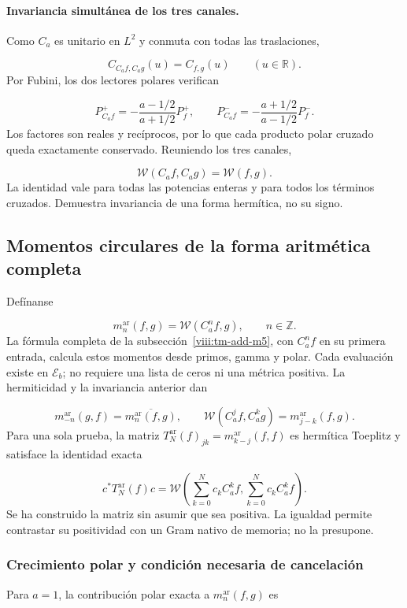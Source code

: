 \paragraph{Invariancia simultánea de los tres canales.}
\label{viii:tm-add:invariancia-weil} Como \(C_a\) es unitario en \(L^2\) y conmuta con todas las traslaciones,

\[
C_{C_af,C_ag}(u)=C_{f,g}(u)\qquad(u\in\mathbb R).
\]
Por Fubini, los dos lectores polares verifican

\[
P_{C_af}^+=-\frac{a-1/2}{a+1/2}P_f^+,
\qquad
P_{C_af}^-=-\frac{a+1/2}{a-1/2}P_f^-.
\]
Los factores son reales y recíprocos, por lo que cada producto polar cruzado queda exactamente conservado. Reuniendo los tres canales,

\[
\boxed{\mathscr W(C_af,C_ag)=\mathscr W(f,g).}
\]
La identidad vale para todas las potencias enteras y para todos los términos cruzados. Demuestra invariancia de una forma hermítica, no su signo.


\subsection{Momentos circulares de la forma aritmética completa}
\label{viii:tm-add-m6}
Defínanse

\[
m_n^{\mathrm{ar}}(f,g)=\mathscr W(C_a^n f,g),\qquad n\in\mathbb Z.
\]
La fórmula completa de la subsección~\ref{viii:tm-add-m5}, con \(C_a^nf\) en su primera entrada, calcula estos momentos desde primos, gamma y polar. Cada evaluación existe en \(\mathscr E_b\); no requiere una lista de ceros ni una métrica positiva. La hermiticidad y la invariancia anterior dan

\[
m_{-n}^{\mathrm{ar}}(g,f)=\overline{m_n^{\mathrm{ar}}(f,g)},\qquad
\mathscr W(C_a^j f,C_a^k g)=m_{j-k}^{\mathrm{ar}}(f,g).
\]
Para una sola prueba, la matriz \(T_N^{\mathrm{ar}}(f)_{jk}=m_{k-j}^{\mathrm{ar}}(f,f)\) es hermítica Toeplitz y satisface la identidad exacta

\[
c^*T_N^{\mathrm{ar}}(f)c
=\mathscr W\!\left(\sum_{k=0}^N c_k C_a^k f,
                    \sum_{k=0}^N c_k C_a^k f\right).
\]
Se ha construido la matriz sin asumir que sea positiva. La igualdad permite contrastar su positividad con un Gram nativo de memoria; no la presupone.


\subsubsection{Crecimiento polar y condición necesaria de cancelación}
\label{viii:tm-add-m6-1}
Para \(a=1\), la contribución polar exacta a \(m_n^{\mathrm{ar}}(f,g)\) es

